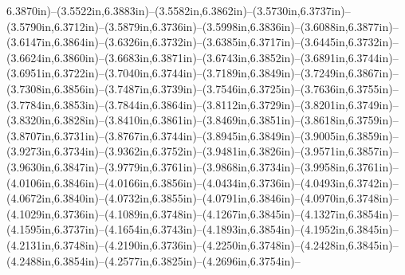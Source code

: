 6.3870in)--(3.5522in,6.3883in)--(3.5582in,6.3862in)--(3.5730in,6.3737in)--(3.5790in,6.3712in)--(3.5879in,6.3736in)--(3.5998in,6.3836in)--(3.6088in,6.3877in)--(3.6147in,6.3864in)--(3.6326in,6.3732in)--(3.6385in,6.3717in)--(3.6445in,6.3732in)--(3.6624in,6.3860in)--(3.6683in,6.3871in)--(3.6743in,6.3852in)--(3.6891in,6.3744in)--(3.6951in,6.3722in)--(3.7040in,6.3744in)--(3.7189in,6.3849in)--(3.7249in,6.3867in)--(3.7308in,6.3856in)--(3.7487in,6.3739in)--(3.7546in,6.3725in)--(3.7636in,6.3755in)--(3.7784in,6.3853in)--(3.7844in,6.3864in)--(3.8112in,6.3729in)--(3.8201in,6.3749in)--(3.8320in,6.3828in)--(3.8410in,6.3861in)--(3.8469in,6.3851in)--(3.8618in,6.3759in)--(3.8707in,6.3731in)--(3.8767in,6.3744in)--(3.8945in,6.3849in)--(3.9005in,6.3859in)--(3.9273in,6.3734in)--(3.9362in,6.3752in)--(3.9481in,6.3826in)--(3.9571in,6.3857in)--(3.9630in,6.3847in)--(3.9779in,6.3761in)--(3.9868in,6.3734in)--(3.9958in,6.3761in)--(4.0106in,6.3846in)--(4.0166in,6.3856in)--(4.0434in,6.3736in)--(4.0493in,6.3742in)--(4.0672in,6.3840in)--(4.0732in,6.3855in)--(4.0791in,6.3846in)--(4.0970in,6.3748in)--(4.1029in,6.3736in)--(4.1089in,6.3748in)--(4.1267in,6.3845in)--(4.1327in,6.3854in)--(4.1595in,6.3737in)--(4.1654in,6.3743in)--(4.1893in,6.3854in)--(4.1952in,6.3845in)--(4.2131in,6.3748in)--(4.2190in,6.3736in)--(4.2250in,6.3748in)--(4.2428in,6.3845in)--(4.2488in,6.3854in)--(4.2577in,6.3825in)--(4.2696in,6.3754in)--
